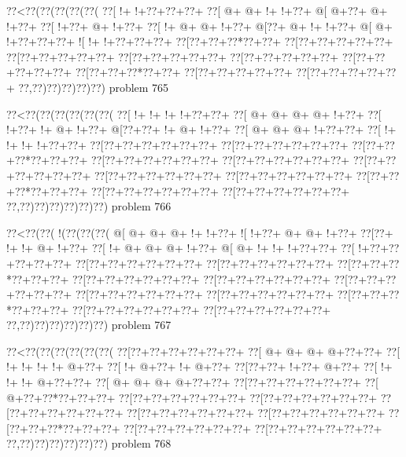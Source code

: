 \vbox{\vbox{\goo
\0??<\0??(\0??(\0??(\0??(\0??(
\0??[\- !+\- !+\0??+\0??+\0??+
\0??[\- @+\- @+\- !+\- !+\0??+
\- @[\- @+\0??+\- @+\- !+\0??+
\0??[\- !+\0??+\- @+\- !+\0??+
\0??[\- !+\- @+\- @+\- !+\0??+
\- @[\0??+\- @+\- !+\- !+\0??+
\- @[\- @+\- !+\0??+\0??+\0??+
\- ![\- !+\- !+\0??+\0??+\0??+
\0??[\0??+\0??+\0??*\0??+\0??+
\0??[\0??+\0??+\0??+\0??+\0??+
\0??[\0??+\0??+\0??+\0??+\0??+
\0??[\0??+\0??+\0??+\0??+\0??+
\0??[\0??+\0??+\0??+\0??+\0??+
\0??[\0??+\0??+\0??+\0??+\0??+
\0??[\0??+\0??+\0??*\0??+\0??+
\0??[\0??+\0??+\0??+\0??+\0??+
\0??[\0??+\0??+\0??+\0??+\0??+
\0??,\0??)\0??)\0??)\0??)\0??)
}
\hfil problem 765\hfil\break
}

\vbox{\vbox{\goo
\0??<\0??(\0??(\0??(\0??(\0??(\0??(
\0??[\- !+\- !+\- !+\- !+\0??+\0??+
\0??[\- @+\- @+\- @+\- @+\- !+\0??+
\0??[\- !+\0??+\- !+\- @+\- !+\0??+
\- @[\0??+\0??+\- !+\- @+\- !+\0??+
\0??[\- @+\- @+\- @+\- !+\0??+\0??+
\0??[\- !+\- !+\- !+\- !+\0??+\0??+
\0??[\0??+\0??+\0??+\0??+\0??+\0??+
\0??[\0??+\0??+\0??+\0??+\0??+\0??+
\0??[\0??+\0??+\0??*\0??+\0??+\0??+
\0??[\0??+\0??+\0??+\0??+\0??+\0??+
\0??[\0??+\0??+\0??+\0??+\0??+\0??+
\0??[\0??+\0??+\0??+\0??+\0??+\0??+
\0??[\0??+\0??+\0??+\0??+\0??+\0??+
\0??[\0??+\0??+\0??+\0??+\0??+\0??+
\0??[\0??+\0??+\0??*\0??+\0??+\0??+
\0??[\0??+\0??+\0??+\0??+\0??+\0??+
\0??[\0??+\0??+\0??+\0??+\0??+\0??+
\0??,\0??)\0??)\0??)\0??)\0??)\0??)
}
\hfil problem 766\hfil\break
}

\vbox{\vbox{\goo
\0??<\0??(\0??(\- !(\0??(\0??(\0??(
\- @[\- @+\- @+\- @+\- !+\- !+\0??+
\- ![\- !+\0??+\- @+\- @+\- !+\0??+
\0??[\0??+\- !+\- !+\- @+\- !+\0??+
\0??[\- !+\- @+\- @+\- @+\- !+\0??+
\- @[\- @+\- !+\- !+\- !+\0??+\0??+
\0??[\- !+\0??+\0??+\0??+\0??+\0??+
\0??[\0??+\0??+\0??+\0??+\0??+\0??+
\0??[\0??+\0??+\0??+\0??+\0??+\0??+
\0??[\0??+\0??+\0??*\0??+\0??+\0??+
\0??[\0??+\0??+\0??+\0??+\0??+\0??+
\0??[\0??+\0??+\0??+\0??+\0??+\0??+
\0??[\0??+\0??+\0??+\0??+\0??+\0??+
\0??[\0??+\0??+\0??+\0??+\0??+\0??+
\0??[\0??+\0??+\0??+\0??+\0??+\0??+
\0??[\0??+\0??+\0??*\0??+\0??+\0??+
\0??[\0??+\0??+\0??+\0??+\0??+\0??+
\0??[\0??+\0??+\0??+\0??+\0??+\0??+
\0??,\0??)\0??)\0??)\0??)\0??)\0??)
}
\hfil problem 767\hfil\break
}

\vbox{\vbox{\goo
\0??<\0??(\0??(\0??(\0??(\0??(\0??(
\0??[\0??+\0??+\0??+\0??+\0??+\0??+
\0??[\- @+\- @+\- @+\- @+\0??+\0??+
\0??[\- !+\- !+\- !+\- !+\- @+\0??+
\0??[\- !+\- @+\0??+\- !+\- @+\0??+
\0??[\0??+\0??+\- !+\0??+\- @+\0??+
\0??[\- !+\- !+\- !+\- @+\0??+\0??+
\0??[\- @+\- @+\- @+\- @+\0??+\0??+
\0??[\0??+\0??+\0??+\0??+\0??+\0??+
\0??[\- @+\0??+\0??*\0??+\0??+\0??+
\0??[\0??+\0??+\0??+\0??+\0??+\0??+
\0??[\0??+\0??+\0??+\0??+\0??+\0??+
\0??[\0??+\0??+\0??+\0??+\0??+\0??+
\0??[\0??+\0??+\0??+\0??+\0??+\0??+
\0??[\0??+\0??+\0??+\0??+\0??+\0??+
\0??[\0??+\0??+\0??*\0??+\0??+\0??+
\0??[\0??+\0??+\0??+\0??+\0??+\0??+
\0??[\0??+\0??+\0??+\0??+\0??+\0??+
\0??,\0??)\0??)\0??)\0??)\0??)\0??)
}
\hfil problem 768\hfil\break
}

